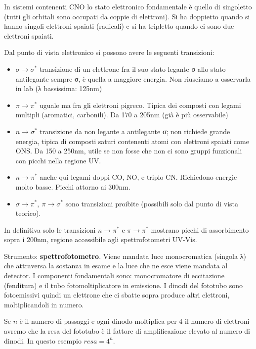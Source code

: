 In sistemi contenenti CNO lo stato elettronico fondamentale è quello di
singoletto (tutti gli orbitali sono occupati da coppie di elettroni). Si
ha doppietto quando si hanno singoli elettroni spaiati (radicali) e si
ha tripletto quando ci sono due elettroni spaiati.

Dal punto di vista elettronico si possono avere le seguenti transizioni:

\begin{itemize}
\item
  \(\sigma \rightarrow \sigma^{*}\) transizione di un elettrone fra il
  suo stato legante σ allo stato antilegante sempre σ, è quella a
  maggiore energia. Non riusciamo a osservarla in lab (λ bassissima:
  125nm)
\item
  \(\pi \rightarrow \pi^{*}\) uguale ma fra gli elettroni pigreco.
  Tipica dei composti con legami multipli (aromatici, carbonili). Da 170
  a 205nm (già è più osservabile)
\item
  \(n \rightarrow \sigma^{*}\) transizione da non legante a antilegante
  σ; non richiede grande energia, tipica di composti saturi contenenti
  atomi con elettroni spaiati come ONS. Da 150 a 250nm, utile se non
  fosse che non ci sono gruppi funzionali con picchi nella regione UV.
\item
  \(n \rightarrow \pi^{*}\) anche qui legami doppi CO, NO, e triplo CN.
  Richiedono energie molto basse. Picchi attorno ai 300nm.
\item
  \(\sigma \rightarrow \pi^{*},\ \pi \rightarrow \sigma^{*}\) sono
  transizioni proibite (possibili solo dal punto di vista teorico).
\end{itemize}

In definitiva solo le transizioni \(n \rightarrow \pi^{*}\) e
\(\pi \rightarrow \pi^{*}\) mostrano picchi di assorbimento sopra i
200nm, regione accessibile agli spettrofotometri UV-Vis.

Strumento: \textbf{spettrofotometro}. Viene mandata luce monocromatica
(singola λ) che attraversa la sostanza in esame e la luce che ne esce
viene mandata al detector. I componenti fondamentali sono: monocromatore
di eccitazione (fenditura) e il tubo fotomoltiplicatore in emissione. I
dinodi del fototubo sono fotoemissivi quindi un elettrone che ci sbatte
sopra produce altri elettroni, moltiplicandoli in numero.

Se \(n\) è il numero di passaggi e ogni dinodo moltiplica per 4 il
numero di elettroni avremo che la resa del fototubo è il fattore di
amplificazione elevato al numero di dinodi. In questo esempio
\(resa = 4^{n}\).

